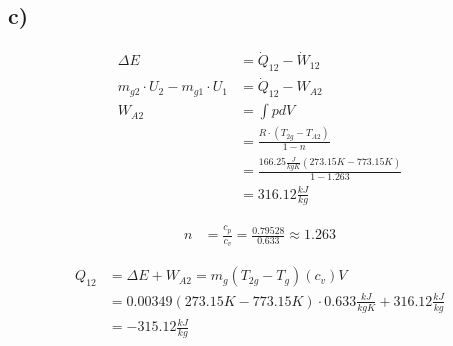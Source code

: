 

\subsection*{c)}

\begin{align*}
\Delta E &= \dot{Q}_{12} - \dot{W}_{12} \\
m_{g2} \cdot U_2 - m_{g1} \cdot U_1 &= \dot{Q}_{12} - W_{A2} \\
W_{A2} &= \int pdV \\
&= \frac{R \cdot (T_{2g} - T_{A2})}{1 - n} \\
&= \frac{166.25 \frac{J}{kgK} (273.15K - 773.15K)}{1 - 1.263} \\
&= 316.12 \frac{kJ}{kg}
\end{align*}

\begin{align*}
n &= \frac{c_p}{c_v} = \frac{0.79528}{0.633} \approx 1.263
\end{align*}

\begin{align*}
Q_{12} &= \Delta E + W_{A2} = m_{g} \left( T_{2g} - T_{g} \right) (c_v) V \\
&= 0.00349 \left( 273.15K - 773.15K \right) \cdot 0.633 \frac{kJ}{kgK} + 316.12 \frac{kJ}{kg} \\
&= -315.12 \frac{kJ}{kg}
\end{align*}